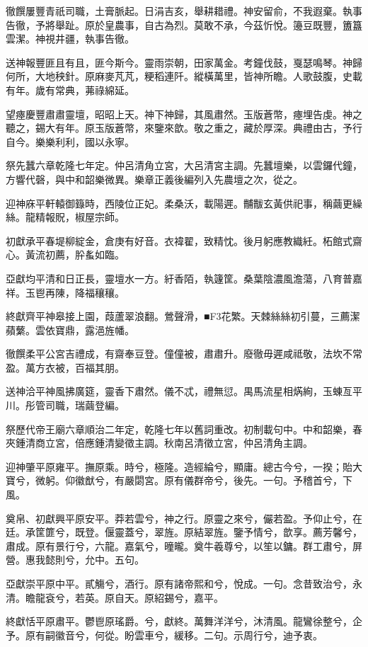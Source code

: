 \begin{pinyinscope}
徹饌屢豐青祇司職，土膏脈起。日涓吉亥，舉耕耤禮。神安留俞，不我遐棄。執事告徹，予將舉趾。原於皇農事，自古為烈。莫敢不承，今茲忻悅。籩豆既豐，簠簋雲潔。神視井疆，執事告徹。

送神報豐匪且有且，匪今斯今。靈雨崇朝，田家萬金。考鐘伐鼓，戛瑟鳴琴。神歸何所，大地秧針。原麻麥芃芃，粳稻連阡。縱橫萬里，皆神所瞻。人歌鼓腹，史載有年。歲有常典，茀祿綿延。

望瘞慶豐肅肅靈壇，昭昭上天。神下神歸，其風肅然。玉版蒼幣，瘞埋告虔。神之聽之，錫大有年。原玉版蒼幣，來鑒來歆。敬之重之，藏於厚深。典禮由古，予行自今。樂樂利利，國以永寧。

祭先蠶六章乾隆七年定。仲呂清角立宮，大呂清宮主調。先蠶壇樂，以雲鑼代鐘，方響代磬，與中和韶樂微異。樂章正義後編列入先農壇之次，從之。

迎神庥平軒轅御籙時，西陵位正妃。柔桑沃，載陽遲。黼黻玄黃供祀事，稱繭更繰絲。龍精報貺，椒屋宗師。

初獻承平春堤柳綻金，倉庚有好音。衣褘翟，致精忱。後月躬應教織紝。柘館式齋心。黃流初薦，肸蚃如臨。

亞獻均平清和日正長，靈壇水一方。紆香陌，執籧筐。桑葉陰濃風澹蕩，八育普嘉祥。玉鬯再陳，降福穰穰。

終獻齊平神皋接上園，葭蘆翠浪翻。鶯聲滑，■F3花繁。天棘絲絲初引蔓，三薦潔蘋蘩。雲依寶鼎，露浥旌幡。

徹饌柔平公宮吉禮成，有齋奉豆登。僮僮被，肅肅升。廢徹毋遲咸祗敬，法坎不常盈。萬方衣被，百福其朋。

送神洽平神風拂廣筵，靈香下肅然。儀不忒，禮無愆。禺馬流星相焫絢，玉蝀亙平川。彤管司職，瑞繭登編。

祭歷代帝王廟六章順治二年定，乾隆七年以舊詞重改。初制載句中。中和韶樂，春夾鍾清商立宮，倍應鍾清變徵主調。秋南呂清徵立宮，仲呂清角主調。

迎神肇平原雍平。撫原乘。時兮，極隆。造經綸兮，顯庸。總古今兮，一揆；貽大寶兮，微躬。仰徽猷兮，有嚴閟宮。原有儀群帝兮，後先。一句。予稽首兮，下風。

奠帛、初獻興平原安平。莽若雲兮，神之行。原靈之來兮，儼若盈。予仰止兮，在廷。承筐篚兮，既登。偃靈蓋兮，翠旌。原結翠旌。鑒予情兮，歆享。薦芳馨兮，肅成。原有景行兮，六龍。嘉氣兮，曈曨。奠牛羲尊兮，以笙以鏞。群工肅兮，屏營。惠我懿則兮，允中。五句。

亞獻崇平原中平。貳觴兮，酒行。原有諸帝熙和兮，悅成。一句。念昔致治兮，永清。瞻龍袞兮，若英。原自天。原紹錫兮，嘉平。

終獻恬平原肅平。鬱鬯原瑤爵。兮，獻終。萬舞洋洋兮，沐清風。龍鸞徐整兮，企予。原有嗣徽音兮，何從。盼雲車兮，緩移。二句。示周行兮，迪予衷。


\end{pinyinscope}
